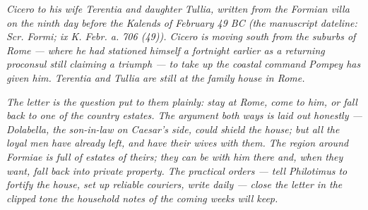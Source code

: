
\textit{Cicero to his wife Terentia and daughter Tullia,
written from the Formian villa on the ninth day before
the Kalends of February 49 BC (the manuscript dateline:
\textit{Scr. Formi; ix K. Febr. a. 706 (49)}). Cicero
is moving south from the suburbs of Rome --- where he
had stationed himself a fortnight earlier as a returning
proconsul still claiming a triumph --- to take up the
coastal command Pompey has given him. Terentia and
Tullia are still at the family house in Rome.}

\textit{The letter is the question put to them plainly:
stay at Rome, come to him, or fall back to one of the
country estates. The argument both ways is laid out
honestly --- Dolabella, the son-in-law on Caesar's
side, could shield the house; but all the loyal men
have already left, and have their wives with them. The
region around Formiae is full of estates of theirs;
they can be with him there and, when they want, fall
back into private property. The practical orders ---
tell Philotimus to fortify the house, set up reliable
couriers, write daily --- close the letter in the
clipped tone the household notes of the coming weeks
will keep.}
